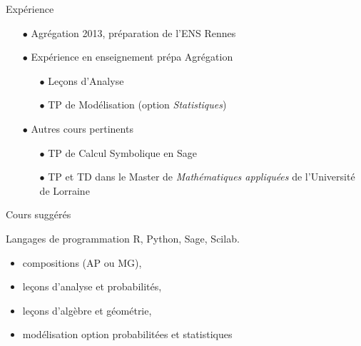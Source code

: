 \begin{frame}{Exp\'erience}

\begin{itemize}
\item[$\bullet$] Agr\'egation 2013, pr\'eparation de l'ENS Rennes
\vfill
\item[$\bullet$] Exp\'erience en enseignement pr\'epa Agr\'egation
\vfill
\begin{itemize}
\item[$\bullet$] Le\c{c}ons d'Analyse 
\vfill
\item[$\bullet$] TP de Mod\'elisation (option \textit{Statistiques}) 
\vfill
\end{itemize}
\item[$\bullet$] Autres cours pertinents
\vfill
\begin{itemize}
\item[$\bullet$] TP de Calcul Symbolique en Sage 
\vfill
\item[$\bullet$] TP et TD dans le Master de \textit{Math\'ematiques appliqu\'ees} de l'Universit\'e de Lorraine 
\vfill
\end{itemize}
\end{itemize}

\end{frame}

\begin{frame}{Cours sugg\'er\'es}
\begin{block}{Langages de programmation}
R, Python, Sage, Scilab.
\end{block}
\vfill
\begin{itemize}
\item compositions (AP ou MG),
\vfill
\item le\c{c}ons d'analyse et probabilit\'es,
\vfill
\item le\c{c}ons d'alg\`ebre et g\'eom\'etrie,
\vfill
\item mod\'elisation option probabilit\'ees et statistiques
\end{itemize}
\vfill
\end{frame}
